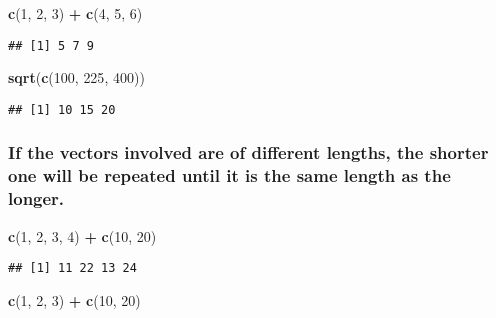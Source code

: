 \documentclass[]{article}
\newenvironment{Shaded}{\begin{snugshade}}{\end{snugshade}}
\newcommand{\KeywordTok}[1]{\textcolor[rgb]{0.13,0.29,0.53}{\textbf{#1}}}
\newcommand{\DecValTok}[1]{\textcolor[rgb]{0.00,0.00,0.81}{#1}}
\newcommand{\StringTok}[1]{\textcolor[rgb]{0.31,0.60,0.02}{#1}}
\newcommand{\OperatorTok}[1]{\textcolor[rgb]{0.81,0.36,0.00}{\textbf{#1}}}
\newcommand{\NormalTok}[1]{#1}
\begin{document}
\begin{Shaded}
\begin{Highlighting}[]
\KeywordTok{c}\NormalTok{(}\DecValTok{1}\NormalTok{, }\DecValTok{2}\NormalTok{, }\DecValTok{3}\NormalTok{) }\OperatorTok{+}\StringTok{ }\KeywordTok{c}\NormalTok{(}\DecValTok{4}\NormalTok{, }\DecValTok{5}\NormalTok{, }\DecValTok{6}\NormalTok{)}
\end{Highlighting}
\end{Shaded}

\begin{verbatim}
## [1] 5 7 9
\end{verbatim}

\begin{Shaded}
\begin{Highlighting}[]
\KeywordTok{sqrt}\NormalTok{(}\KeywordTok{c}\NormalTok{(}\DecValTok{100}\NormalTok{, }\DecValTok{225}\NormalTok{, }\DecValTok{400}\NormalTok{))}
\end{Highlighting}
\end{Shaded}

\begin{verbatim}
## [1] 10 15 20
\end{verbatim}

\subsubsection{If the vectors involved are of different lengths, the
shorter one will be repeated until it is the same length as the
longer.}\label{if-the-vectors-involved-are-of-different-lengths-the-shorter-one-will-be-repeated-until-it-is-the-same-length-as-the-longer.}

\begin{Shaded}
\begin{Highlighting}[]
\KeywordTok{c}\NormalTok{(}\DecValTok{1}\NormalTok{, }\DecValTok{2}\NormalTok{, }\DecValTok{3}\NormalTok{, }\DecValTok{4}\NormalTok{) }\OperatorTok{+}\StringTok{ }\KeywordTok{c}\NormalTok{(}\DecValTok{10}\NormalTok{, }\DecValTok{20}\NormalTok{)}
\end{Highlighting}
\end{Shaded}

\begin{verbatim}
## [1] 11 22 13 24
\end{verbatim}

\begin{Shaded}
\begin{Highlighting}[]
\KeywordTok{c}\NormalTok{(}\DecValTok{1}\NormalTok{, }\DecValTok{2}\NormalTok{, }\DecValTok{3}\NormalTok{) }\OperatorTok{+}\StringTok{ }\KeywordTok{c}\NormalTok{(}\DecValTok{10}\NormalTok{, }\DecValTok{20}\NormalTok{)}
\end{Highlighting}
\end{Shaded}
\end{document}
